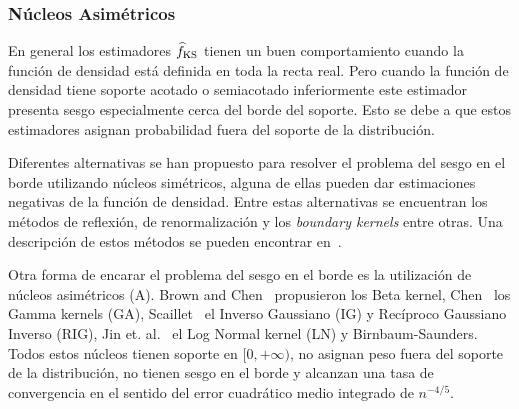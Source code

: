


\subsubsection{Núcleos Asimétricos}

En general los estimadores $\widehat{f}_{\tiny \text {KS}}$ tienen un buen comportamiento cuando la función de densidad está definida en toda la recta real. Pero cuando la función de densidad tiene soporte acotado o semiacotado inferiormente este estimador presenta sesgo especialmente cerca del borde del soporte. Esto se debe a que estos estimadores asignan probabilidad fuera del soporte de la distribución.

Diferentes alternativas se han propuesto para resolver el problema del sesgo en el borde utilizando núcleos simétricos, alguna de ellas pueden dar estimaciones negativas de la función de densidad. Entre estas alternativas se encuentran los métodos de reflexión, de renormalización y los \textit{boundary kernels} entre otras. Una descripción de estos métodos se pueden encontrar en~\cite{Jones1993}.


Otra forma de encarar el problema del sesgo en el borde es la utilización de núcleos asimétricos (A). Brown and Chen~\cite{Brown1999,chen1999} propusieron los Beta kernel, Chen~\cite{chensx2000} los Gamma kernels (GA), Scaillet~\cite{Scaillet2004} el Inverso Gaussiano (IG) y Recíproco Gaussiano Inverso (RIG), Jin et. al.~\cite{Jin2003} el Log Normal kernel (LN) y Birnbaum-Saunders. Todos estos núcleos tienen soporte en $[0,+\infty)$, no asignan peso fuera del soporte de la distribución, no tienen sesgo en el borde y alcanzan una tasa de convergencia en el sentido del error cuadrático medio integrado de $n^{-4/5}.$

